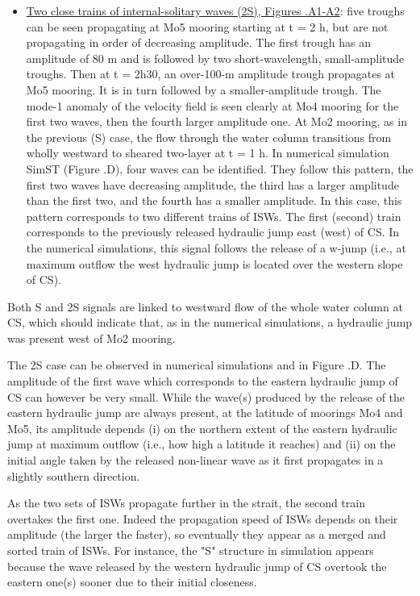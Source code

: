 \begin{itemize}
%
\item \underline{Two close trains of internal-solitary waves (2S), Figures .A1-A2}: five troughs can be seen propagating at Mo5 mooring starting at t = 2 h, but are not propagating in order of decreasing amplitude. The first trough has an amplitude of 80 m and is followed by two short-wavelength, small-amplitude troughs. Then at t = 2h30, an over-100-m amplitude trough propagates at Mo5 mooring. It is in turn followed by a smaller-amplitude trough. The mode-1 anomaly of the velocity field is seen clearly at Mo4 mooring for the first two waves, then the fourth larger amplitude one. At Mo2 mooring, as in the previous (S) case, the flow through the water column transitions from wholly westward to sheared two-layer at t = 1 h. In numerical simulation SimST (Figure .D), four waves can be identified. They follow this pattern, the first two waves have decreasing amplitude, the third has a larger amplitude than the first two, and the fourth has a smaller amplitude. In this case, this pattern corresponds to two different trains of ISWs. The first (second) train corresponds to the previously  released hydraulic jump east (west) of CS. In the numerical simulations, this signal follows the release of a w-jump (i.e., at maximum outflow the west hydraulic jump is located over the western slope of CS).
\end{itemize}

Both S and 2S signals are linked to westward flow of the whole water column at CS, which should indicate that, as in the numerical simulations, a hydraulic jump was present west of Mo2 mooring.

The 2S case can be observed in numerical simulations and in Figure .D. The amplitude of the first wave which corresponds to the eastern hydraulic jump of CS can however be very small. While the wave(s) produced by the release of the eastern hydraulic jump are always present, at the latitude of moorings Mo4 and Mo5, its amplitude depends (i) on the northern extent of the eastern hydraulic jump at maximum outflow (i.e., how high a latitude it reaches) and (ii) on the initial angle taken by the released non-linear wave as it first propagates in a slightly southern direction.

As the two sets of ISWs propagate further in the strait, the second train overtakes the first one. Indeed the propagation speed of ISWs depends on their amplitude (the larger the faster), so eventually they appear as a merged and sorted train of ISWs. For instance, the "S" structure in simulation appears because the wave released by the western hydraulic jump of CS overtook the eastern one(s) sooner due to their initial closeness.

